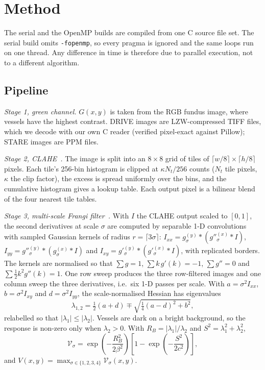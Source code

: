 \section{Method}\label{sec:method}

The serial and the OpenMP builds are compiled from one C source file set. The serial build omits
\texttt{-fopenmp}, so every pragma is ignored and the same loops run on one thread. Any difference in time is
therefore due to parallel execution, not to a different algorithm.

\subsection{Pipeline}\label{sec:pipeline}
\textit{Stage 1, green channel.} $G(x,y)$ is taken from the RGB fundus image, where vessels have the highest
contrast. DRIVE images are LZW-compressed TIFF files, which we decode with our own C reader (verified
pixel-exact against Pillow); STARE images are PPM files.

\textit{Stage 2, CLAHE~\cite{zuiderveld1994}.} The image is split into an $8\times8$ grid of tiles of
$\lceil w/8\rceil\times\lceil h/8\rceil$ pixels. Each tile's 256-bin histogram is clipped at
$\kappa N_t/256$ counts ($N_t$ tile pixels, $\kappa$ the clip factor), the excess is spread uniformly over the
bins, and the cumulative histogram gives a lookup table. Each output pixel is a bilinear blend of the four
nearest tile tables.

\textit{Stage 3, multi-scale Frangi filter~\cite{frangi1998}.} With $I$ the CLAHE output scaled to $[0,1]$, the
second derivatives at scale $\sigma$ are computed by separable 1-D convolutions with sampled Gaussian kernels of
radius $r=\lceil3\sigma\rceil$: $I_{xx}=g_\sigma^{(y)}*(g''^{(x)}_\sigma*I)$,
$I_{yy}=g''^{(y)}_\sigma*(g^{(x)}_\sigma*I)$ and $I_{xy}=g'^{(y)}_\sigma*(g'^{(x)}_\sigma*I)$, with replicated
borders. The kernels are normalised so that $\sum g=1$, $\sum k\,g'(k)=-1$, $\sum g''=0$ and
$\sum \tfrac12k^2g''(k)=1$. One row sweep produces the three row-filtered images and one column sweep the three
derivatives, i.e.\ six 1-D passes per scale. With $a=\sigma^2I_{xx}$, $b=\sigma^2I_{xy}$ and
$d=\sigma^2I_{yy}$, the scale-normalised Hessian has eigenvalues
\begin{equation}
\lambda_{1,2}=\tfrac12(a+d)\mp\sqrt{\tfrac14(a-d)^2+b^2},
\end{equation}
relabelled so that $|\lambda_1|\le|\lambda_2|$. Vessels are dark on a bright background, so the response is
non-zero only when $\lambda_2>0$. With $R_B=|\lambda_1|/\lambda_2$ and $S^2=\lambda_1^2+\lambda_2^2$,
\begin{equation}
\mathcal V_\sigma=\exp\!\left(-\frac{R_B^2}{2\beta^2}\right)\left[1-\exp\!\left(-\frac{S^2}{2c^2}\right)\right],
\end{equation}
and $V(x,y)=\max_{\sigma\in\{1,2,3,4\}}\mathcal V_\sigma(x,y)$.

